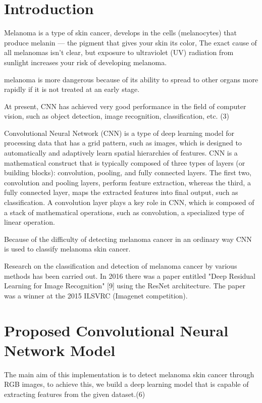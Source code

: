 \section{Introduction}
    Melanoma is a type of skin cancer, develops in the cells (melanocytes) that produce melanin — the pigment that gives your skin its color, The exact cause of all melanomas isn't clear, but exposure to ultraviolet (UV) radiation from sunlight increases your risk of developing melanoma. ~\cite{mayo2022}

    melanoma is more dangerous because of its ability to spread to other organs more rapidly if it is not treated at an early stage. ~\cite{scfm2022}

    At present, CNN has achieved very good performance in the field of computer vision, such as object detection, image recognition, classification, etc. (3)

    Convolutional Neural Network (CNN) is a type of deep learning model for processing data that has a grid pattern, such as images, which is designed to automatically and adaptively learn spatial hierarchies of features. CNN is a mathematical construct that is typically composed of three types of layers (or building blocks): convolution, pooling, and fully connected layers. The first two, convolution and pooling layers, perform feature extraction, whereas the third, a fully connected layer, maps the extracted features into final output, such as classification. A convolution layer plays a key role in CNN, which is composed of a stack of mathematical operations, such as convolution, a specialized type of linear operation. \cite{Yamashita2018}

    Because of the difficulty of detecting melanoma cancer in an ordinary way CNN is used to classify melanoma skin cancer.

    Research on the classification and detection of melanoma cancer by various methods has been carried out. In 2016 there was a paper entitled "Deep Residual Learning for Image Recognition" [9] using the ResNet architecture. The paper was a winner at the 2015 ILSVRC (Imagenet competition). ~\cite{Arief2019}


\section{Proposed Convolutional Neural Network Model}
    The main aim of this implementation is to detect melanoma skin cancer through RGB images, to achieve this, we build a deep learning model that is capable of extracting features from the given dataset.(6)


